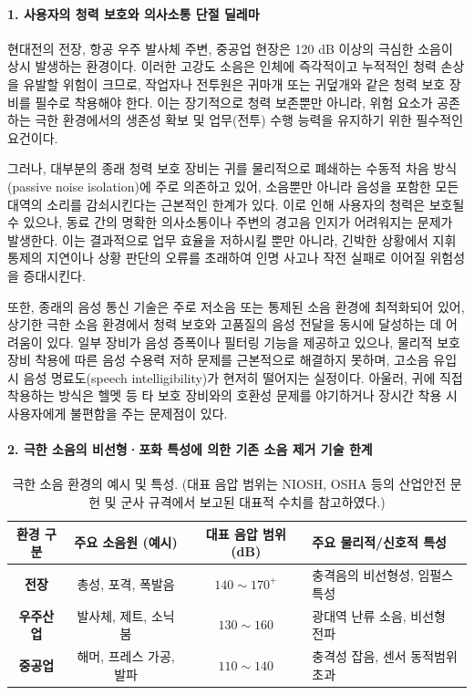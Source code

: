 \documentclass{article}
\begin{document}
\paragraph{1. 사용자의 청력 보호와 의사소통 단절 딜레마}

현대전의 전장, 항공 우주 발사체 주변, 중공업 현장은 120 dB 이상의 극심한 소음이 상시 발생하는 환경이다. 
이러한 고강도 소음은 인체에 즉각적이고 누적적인 청력 손상을 유발할 위험이 크므로, 작업자나 전투원은 귀마개 또는 귀덮개와 같은 청력 보호 장비를 필수로 착용해야 한다. 
이는 장기적으로 청력 보존뿐만 아니라, 위험 요소가 공존하는 극한 환경에서의 생존성 확보 및 업무(전투) 수행 능력을 유지하기 위한 필수적인 요건이다.

그러나, 대부분의 종래 청력 보호 장비는 귀를 물리적으로 폐쇄하는 수동적 차음 방식(passive noise isolation)에 주로 의존하고 있어, 소음뿐만 아니라 음성을 포함한 모든 대역의 소리를 감쇠시킨다는 근본적인 한계가 있다. 이로 인해 사용자의 청력은 보호될 수 있으나, 동료 간의 명확한 의사소통이나 주변의 경고음 인지가 어려워지는 문제가 발생한다. 이는 결과적으로 업무 효율을 저하시킬 뿐만 아니라, 긴박한 상황에서 지휘 통제의 지연이나 상황 판단의 오류를 초래하여 인명 사고나 작전 실패로 이어질 위험성을 증대시킨다.

또한, 종래의 음성 통신 기술은 주로 저소음 또는 통제된 소음 환경에 최적화되어 있어, 상기한 극한 소음 환경에서 청력 보호와 고품질의 음성 전달을 동시에 달성하는 데 어려움이 있다. 
일부 장비가 음성 증폭이나 필터링 기능을 제공하고 있으나, 물리적 보호 장비 착용에 따른 음성 수용력 저하 문제를 근본적으로 해결하지 못하며, 고소음 유입 시 음성 명료도(speech intelligibility)가 현저히 떨어지는 실정이다. 아울러, 귀에 직접 착용하는 방식은 헬멧 등 타 보호 장비와의 호환성 문제를 야기하거나 장시간 착용 시 사용자에게 불편함을 주는 문제점이 있다.



\paragraph{2. 극한 소음의 비선형·포화 특성에 의한 기존 소음 제거 기술 한계}

\begin{table}[b]
    \centering
    \renewcommand{\arraystretch}{1.3} %
    \begin{tabular}{c c c l} %
        \hline
        \textbf{환경 구분} & \textbf{주요 소음원 (예시)} & \textbf{대표 음압 범위 (dB)}& \textbf{주요 물리적/신호적 특성} \\
        \hline
        \hline
        \textbf{전장} & 총성, 포격, 폭발음 & $140 \sim 170^+$ & 충격음의 비선형성, 임펄스 특성  \\
        \hline
        \textbf{우주산업} & 발사체, 제트, 소닉붐 & $130 \sim 160$ & 광대역 난류 소음, 비선형 전파 \\
        \hline
        \textbf{중공업} & 해머, 프레스 가공, 발파 & $110 \sim 140$ & 충격성 잡음, 센서 동적범위 초과 \\
        \hline
    \end{tabular}
    \caption{극한 소음 환경의 예시 및 특성. (대표 음압 범위는 NIOSH, OSHA 등의 산업안전 문헌 및 군사 규격에서 보고된 대표적 수치를 참고하였다.)}
    \label{tab:extreme_noise_examples}
\end{table}
\end{document}
